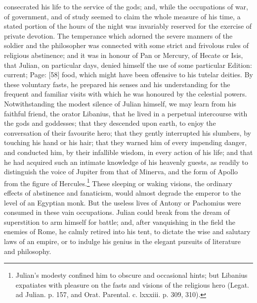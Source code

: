 consecrated his life to the service of the gods; and, while the occupations of war, of government, and of study seemed to claim the whole measure of his time, a stated portion of the hours of the night was invariably reserved for the exercise of private devotion. The temperance which adorned the severe manners of the soldier and the philosopher was connected with some strict and frivolous rules of religious abstinence; and it was in honour of Pan or Mercury, of Hecate or Isis, that Julian, on particular days, denied himself the use of some particular Edition: current; Page: [58] food, which might have been offensive to his tutelar deities. By these voluntary fasts, he prepared his senses and his understanding for the frequent and familiar visits with which he was honoured by the celestial powers. Notwithstanding the modest silence of Julian himself, we may learn from his faithful friend, the orator Libanius, that he lived in a perpetual intercourse with the gods and goddesses; that they descended upon earth, to enjoy the conversation of their favourite hero; that they gently interrupted his slumbers, by touching his hand or his hair; that they warned him of every impending danger, and conducted him, by their infallible wisdom, in every action of his life; and that he had acquired such an intimate knowledge of his heavenly guests, as readily to distinguish the voice of Jupiter from that of Minerva, and the form of Apollo from the figure of Hercules.\footnote{Julian\texthebrew{}’s modesty confined him to obscure and occasional hints; but Libanius expatiates with pleasure on the fasts and visions of the religious hero (Legat. ad Julian. p. 157, and Orat. Parental. c. lxxxiii. p. 309, 310).} These sleeping or waking visions, the ordinary effects of abstinence and fanaticism, would almost degrade the emperor to the level of an Egyptian monk. But the useless lives of Antony or Pachomius were consumed in these vain occupations. Julian could break from the dream of superstition to arm himself for battle; and, after vanquishing in the field the enemies of Rome, he calmly retired into his tent, to dictate the wise and salutary laws of an empire, or to indulge his genius in the elegant pursuits of literature and philosophy.

